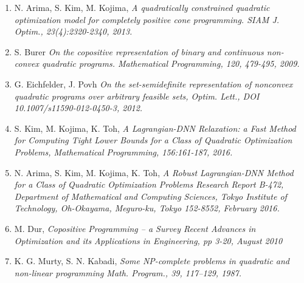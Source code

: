 \documentclass[12pt]{book}
\theoremstyle{definition}
\begin{document}
\begin{enumerate}
\item N. Arima, S. Kim, M. Kojima, \it A quadratically constrained quadratic optimization model
for completely positive cone programming. \rm SIAM J. Optim., 23(4):2320-2340, 2013.
\label{ArimaKimKojimaQCQPforCPP}
%
\item S. Burer \it On the copositive representation of binary and continuous non- convex quadratic
programs. \rm Mathematical Programming, 120, 479-495, 2009. 
\label{BurerCPPreprOfBinLCQP}
%
\item G. Eichfelder, J. Povh \it On the set-semidefinite representation of nonconvex quadratic
programs over arbitrary feasible sets, \rm Optim. Lett., DOI 10.1007/s11590-012-0450-3, 2012.
\label{EichfelderPovhSetSDPreprOfQCQP}
%
\item S. Kim, M. Kojima, K. Toh, \it A Lagrangian-DNN Relaxation: a Fast Method for Computing Tight Lower
Bounds for a Class of Quadratic Optimization Problems, \rm  Mathematical Programming, 156:161-187, 2016.
\label{KimKojimaLagrangianDNNRelaxation1}
%
\item N. Arima, S. Kim, M. Kojima, K. Toh, \it A Robust Lagrangian-DNN Method for
a Class of Quadratic Optimization Problems \rm Research Report B-472, Department of Mathematical
and Computing Sciences, Tokyo Institute of Technology, Oh-Okayama, Meguro-ku,
Tokyo 152-8552, February 2016.
\label{ArimaKimKojimaRobustLagrangianDNN}
%
\item M. Dur, \it Copositive Programming – a Survey \rm Recent Advances in Optimization and its Applications in Engineering, pp 3-20, August 2010
\label{DurCopositiveSurvey}
% 
\item K. G. Murty, S. N. Kabadi, \it Some NP-complete problems in quadratic and non-linear
programming \rm Math. Program., 39, 117–129, 1987.
\label{MurtyNPcompleteQP}




\end{enumerate}
\end{document}

